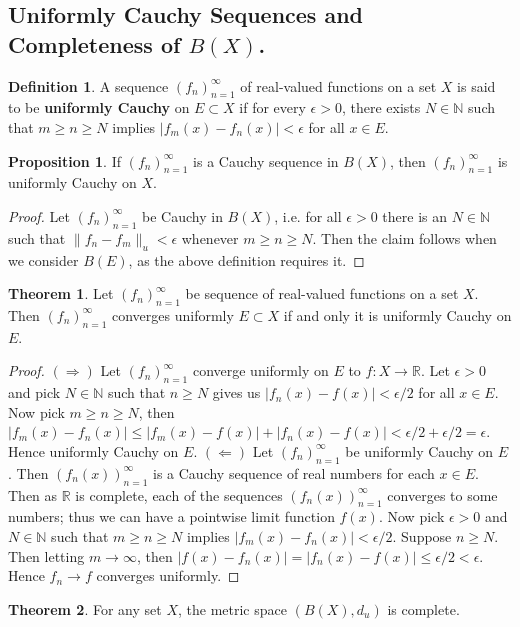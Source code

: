 \documentclass[oneside]{amsart}
\theoremstyle{definition}
\newtheorem{defi}{Definition}[section]
\newtheorem{theorem}{Theorem}[section]
\newtheorem{prop}{Proposition}[section]
\newcommand{\rr}{\mathbb R}
\newcommand{\nn}{\mathbb N}
\begin{document}
\subsection{Uniformly Cauchy Sequences and Completeness of $B(X)$.}
\begin{defi}
A sequence $(f_n)_{n=1}^\infty$ of real-valued functions on a set $X$ is said to be \textbf{uniformly Cauchy} on $E \subset X$ if for every $\epsilon > 0$, there exists $N \in \nn$ such that $m \geq n \geq N$ implies $ |f_m (x) - f_n(x)| < \epsilon$ for all $x \in E$.	
\end{defi}
\begin{prop} \label{prop: 1.2}
If $(f_n)_{n=1}^\infty$ is a Cauchy sequence in $B(X)$, then $(f_n)_{n=1}^\infty$ is uniformly Cauchy on $X$.	
\end{prop}
\begin{proof}
	Let $(f_n)_{n=1}^\infty$ be Cauchy in $B(X)$, i.e. for all $\epsilon > 0$ there is an $N \in \nn$ such that $\|f_n - f_m\|_u < \epsilon$ whenever $m \geq n \geq N$. Then the claim follows when we consider $B(E)$, as the above definition requires it. 
\end{proof}
\begin{theorem}\label{Thm: 1.1.} Let $(f_n)_{n=1}^\infty$ be sequence of real-valued functions on a set $X$. Then $(f_n)_{n=1}^\infty$ converges uniformly $E \subset X$ if and only it is uniformly Cauchy on $E$.
\end{theorem}
\begin{proof} $(\Rightarrow)$ Let $(f_n)_{n=1}^\infty$ converge uniformly on $E$ to $f \colon X \to \rr$. Let $\epsilon > 0$ and pick $N \in \nn$ such that $n \geq N$ gives us $|f_n(x) - f(x)| < \epsilon/2$ for all $x \in E$. Now pick $m \geq n \geq N$, then $ |f_m (x) - f_n(x)| \leq |f_m (x) - f(x) |+ |f_n(x) -f(x)| < \epsilon/2 + \epsilon/2 = \epsilon$. Hence uniformly Cauchy on $E$. $(\Leftarrow)$ Let $(f_n)_{n=1}^\infty$ be uniformly Cauchy on $E$. Then $(f_n(x))_{n=1}^\infty$ is a Cauchy sequence of real numbers for each $x \in E$. Then as $\rr$ is complete, each of the sequences $(f_n(x))_{n=1}^\infty$ converges to some numbers; thus we can have a pointwise limit function $f(x)$. Now pick $\epsilon > 0$ and $N \in \nn$ such that $m \geq n \geq N$ implies $|f_m(x)-f_n(x)| < \epsilon/2$. Suppose $n \geq N$. Then letting $m \to \infty$, then $|f(x)-f_n(x)| = |f_n(x)-f(x) | \leq \epsilon/2 < \epsilon$. Hence $f_n \to f$ converges uniformly. 
\end{proof}
\begin{theorem}
	For any set $X$, the metric space $(B(X), d_u)$ is complete.
\end{theorem}
\end{document}
